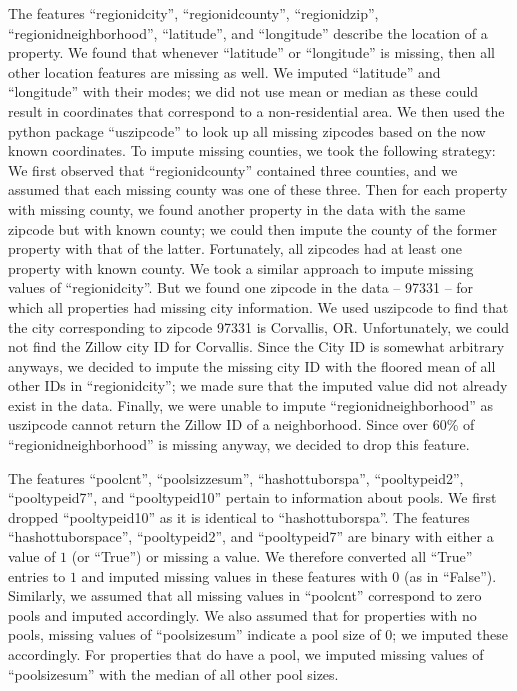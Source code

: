 \documentclass[12pt]{article}
\begin{document}
\begin{enumerate}
The features ``regionidcity'', ``regionidcounty'', ``regionidzip'', ``regionidneighborhood'', ``latitude'', and ``longitude'' describe the location of a property. We found that whenever ``latitude'' or ``longitude'' is missing, then all other location features are missing as well. We imputed ``latitude'' and ``longitude'' with their modes; we did not use mean or median as these could result in coordinates that correspond to a non-residential area. We then used the python package ``uszipcode'' to look up all missing zipcodes based on the now known coordinates. To impute missing counties, we took the following strategy: We first observed that ``regionidcounty'' contained three counties, and we assumed that each missing county was one of these three. Then for each property with missing county, we found another property in the data with the same zipcode but with known county; we could then impute the county of the former property with that of the latter. Fortunately, all zipcodes had at least one property with known county. We took a similar approach to impute missing values of ``regionidcity''. But we found one zipcode in the data -- 97331 -- for which all properties had missing city information. We used uszipcode to find that the city corresponding to zipcode 97331 is Corvallis, OR. Unfortunately, we could not find the Zillow city ID for Corvallis. Since the City ID is somewhat arbitrary anyways, we decided to impute the missing city ID with the floored mean of all other IDs in ``regionidcity''; we made sure that the imputed value did not already exist in the data. Finally, we were unable to impute ``regionidneighborhood'' as uszipcode cannot return the Zillow ID of a neighborhood. Since over 60\% of ``regionidneighborhood'' is missing anyway, we decided to drop this feature.

The features ``poolcnt'', ``poolsizzesum'', ``hashottuborspa'', ``pooltypeid2'', ``pooltypeid7'', and ``pooltypeid10'' pertain to information about pools. We first dropped ``pooltypeid10'' as it is identical to ``hashottuborspa''. The features ``hashottuborspace'', ``pooltypeid2'', and ``pooltypeid7'' are binary with either a value of $1$ (or ``True'') or missing a value. We therefore converted all ``True'' entries to $1$ and imputed missing values in these features with $0$ (as in ``False''). Similarly, we assumed that all missing values in ``poolcnt'' correspond to zero pools and imputed accordingly. We also assumed that for properties with no pools, missing values of ``poolsizesum'' indicate a pool size of $0$; we imputed these accordingly. For properties that do have a pool, we imputed missing values of ``poolsizesum'' with the median of all other pool sizes.


\end{enumerate}
\end{document}
